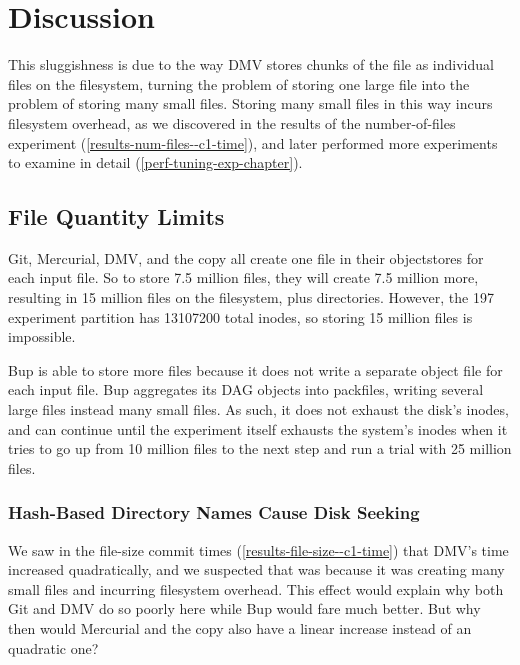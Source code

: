 \section{Discussion}




This sluggishness is due to the way DMV stores chunks of the file as individual files on the filesystem, turning the problem of storing one large file into the problem of storing many small files.
Storing many small files in this way incurs filesystem overhead, as we discovered in the results of the number-of-files experiment (\autoref{results-num-files--c1-time}), and later performed more experiments to examine in detail (\autoref{perf-tuning-exp-chapter}).

\subsection{File Quantity Limits}

Git, Mercurial, DMV, and the copy all create one file in their \glspl{objectstore} for each input file.
So to store \num{7.5} million files, they will create \num{7.5} million more, resulting in \num{15} million files on the filesystem, plus directories.
However, the \SI{197}{\gib} experiment partition has \num{13107200} total \glspl{inode}, so storing \num{15} million files is impossible.

Bup is able to store more files because it does not write a separate object file for each input file.
Bup aggregates its DAG objects into \glspl{packfile}, writing several large files instead many small files.
As such, it does not exhaust the disk's \glspl{inode}, and can continue until the experiment itself exhausts the system's \glspl{inode} when it tries to go up from \num{10} million files to the next step and run a trial with \num{25} million files.

\subsubsection{Hash-Based Directory Names Cause Disk Seeking}


We saw in the file-size commit times (\autoref{results-file-size--c1-time}) that DMV's time increased quadratically, and we suspected that was because it was creating many small files and incurring filesystem overhead.
This effect would explain why both Git and DMV do so poorly here while Bup would fare much better.
But why then would Mercurial and the copy also have a linear increase instead of an quadratic one?

